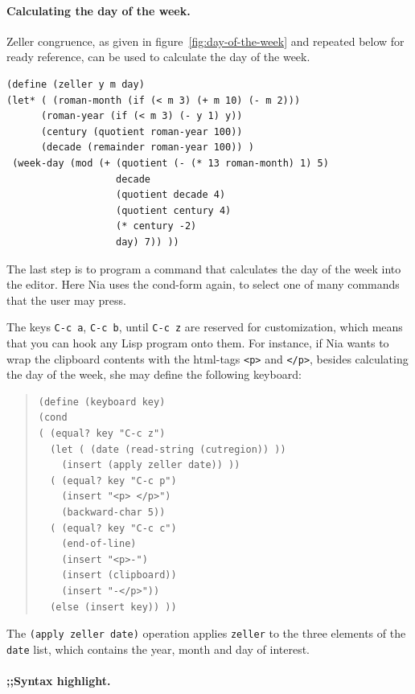 \documentclass[a4paper,12pt]{book}
\begin{document}
\paragraph{Calculating the day of the week.}
Zeller congruence, as given in
figure~\ref{fig:day-of-the-week}
and repeated below 
for ready reference,
can be used to calculate the
day of the week.
\begin{verbatim}
(define (zeller y m day)
(let* ( (roman-month (if (< m 3) (+ m 10) (- m 2)))
      (roman-year (if (< m 3) (- y 1) y))
      (century (quotient roman-year 100))
      (decade (remainder roman-year 100)) )
 (week-day (mod (+ (quotient (- (* 13 roman-month) 1) 5)
                   decade
                   (quotient decade 4)
                   (quotient century 4)
                   (* century -2)
                   day) 7)) ))
\end{verbatim}

The last step is to program a command
that calculates the day of the week
into the editor. Here Nia uses the
cond-form again, to select one of 
many commands that the user may press.

The keys \verb|C-c a|, \verb|C-c b|,
until \verb|C-c z| are reserved for
customization, which means that you
can hook any Lisp program onto them.
For instance, if Nia wants to wrap
the clipboard contents with the
html-tags \verb|<p>| and \verb|</p>|,
besides calculating the day of 
the week, she may define the
following keyboard:
\begin{quote}
\begin{verbatim}
(define (keyboard key) 
(cond
( (equal? key "C-c z")
  (let ( (date (read-string (cutregion)) ))
    (insert (apply zeller date)) ))
  ( (equal? key "C-c p") 
    (insert "<p> </p>")
    (backward-char 5))
  ( (equal? key "C-c c")
    (end-of-line)
    (insert "<p>-")
    (insert (clipboard))
    (insert "-</p>"))
  (else (insert key)) ))
\end{verbatim}
\end{quote}
The \verb|(apply zeller date)| operation
applies \verb|zeller| 
to the three elements of the  \verb|date| list,
which contains the year, month and day of interest.

\paragraph{;;Syntax highlight.}
\end{document}
